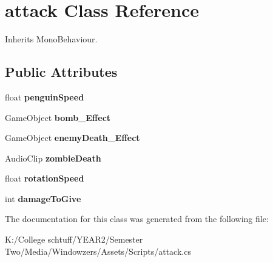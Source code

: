 \hypertarget{classattack}{}\section{attack Class Reference}
\label{classattack}


Inherits Mono\+Behaviour.

\subsection*{Public Attributes}
\begin{DoxyCompactItemize}
\item 
\mbox{\label{classattack_a2d63ad7b43fb823fbdc1925d28268060}} 
float {\bfseries penguin\+Speed}
\item 
\mbox{\label{classattack_a534dc57b717e006a35568290c2be2e2b}} 
Game\+Object {\bfseries bomb\+\_\+\+Effect}
\item 
\mbox{\label{classattack_a679f4ae398eaa58931370c3fb4acf6a1}} 
Game\+Object {\bfseries enemy\+Death\+\_\+\+Effect}
\item 
\mbox{\label{classattack_a22055fc8188944e09b29bad99ed47b1d}} 
Audio\+Clip {\bfseries zombie\+Death}
\item 
\mbox{\label{classattack_a63238998a838f1ced736932ba8f25c07}} 
float {\bfseries rotation\+Speed}
\item 
\mbox{\label{classattack_a7ac2840a2ce4cf7ab3c9a225cfb9e4b9}} 
int {\bfseries damage\+To\+Give}
\end{DoxyCompactItemize}


The documentation for this class was generated from the following file\+:\begin{DoxyCompactItemize}
\item 
K\+:/\+College schtuff/\+Y\+E\+A\+R2/\+Semester Two/\+Media/\+Windowzers/\+Assets/\+Scripts/attack.\+cs\end{DoxyCompactItemize}
